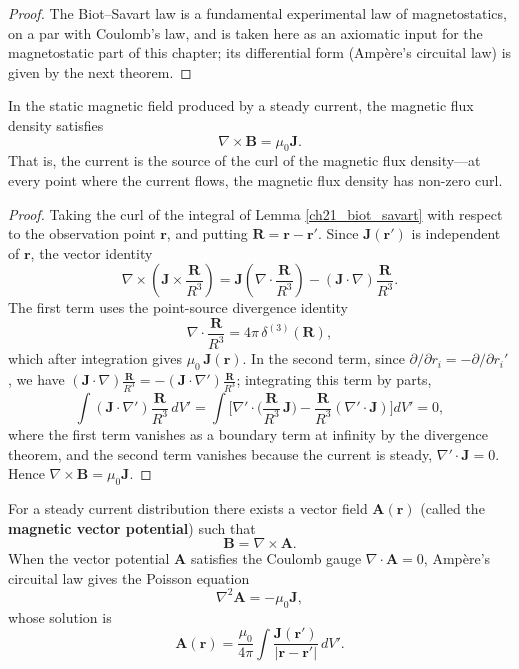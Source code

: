 \begin{proof}
The Biot--Savart law is a fundamental experimental law of magnetostatics, on a par with Coulomb's law, and is taken here as an axiomatic input for the magnetostatic part of this chapter; its differential form (Amp\`ere's circuital law) is given by the next theorem.
\end{proof}

\begin{theorem}\label{thm:ampere_law}
In the static magnetic field produced by a steady current, the magnetic flux density satisfies
\[
\boxed{\nabla \times \mathbf{B} = \mu_0 \mathbf{J}}.
\]
That is, the current is the source of the curl of the magnetic flux density---at every point where the current flows, the magnetic flux density has non-zero curl.
\end{theorem}

\begin{proof}
Taking the curl of the integral of Lemma \ref{ch21_biot_savart} with respect to the observation point $\mathbf{r}$, and putting $\mathbf{R}=\mathbf{r}-\mathbf{r}'$. Since $\mathbf{J}(\mathbf{r}')$ is independent of $\mathbf{r}$, the vector identity
\[
\nabla\times\left(\mathbf{J}\times\frac{\mathbf{R}}{R^3}\right)
= \mathbf{J}\left(\nabla\cdot\frac{\mathbf{R}}{R^3}\right)
- (\mathbf{J}\cdot\nabla)\frac{\mathbf{R}}{R^3}.
\]
The first term uses the point-source divergence identity
\[
\nabla\cdot\frac{\mathbf{R}}{R^3} = 4\pi\,\delta^{(3)}(\mathbf{R}),
\]
which after integration gives $\mu_0\,\mathbf{J}(\mathbf{r})$. In the second term, since $\partial/\partial r_i = -\partial/\partial r_i'$, we have $(\mathbf{J}\cdot\nabla)\frac{\mathbf{R}}{R^3} = -(\mathbf{J}\cdot\nabla')\frac{\mathbf{R}}{R^3}$; integrating this term by parts,
\[
\int (\mathbf{J}\cdot\nabla')\frac{\mathbf{R}}{R^3}\,dV'
= \int\Big[\nabla'\cdot\Big(\frac{\mathbf{R}}{R^3}\,\mathbf{J}\Big) - \frac{\mathbf{R}}{R^3}(\nabla'\cdot\mathbf{J})\Big]dV'
= 0,
\]
where the first term vanishes as a boundary term at infinity by the divergence theorem, and the second term vanishes because the current is steady, $\nabla'\cdot\mathbf{J}=0$. Hence $\nabla\times\mathbf{B} = \mu_0\mathbf{J}$.
\end{proof}

\begin{theorem}\label{thm:magnetic_vector_potential}
For a steady current distribution there exists a vector field $\mathbf{A}(\mathbf{r})$ (called the \textbf{magnetic vector potential}) such that
\[
\boxed{\mathbf{B} = \nabla \times \mathbf{A}}.
\]
When the vector potential $\mathbf{A}$ satisfies the Coulomb gauge $\nabla \cdot \mathbf{A} = 0$, Amp\`ere's circuital law gives the Poisson equation
\[
\nabla^2 \mathbf{A} = -\mu_0 \mathbf{J},
\]
whose solution is
\[
\mathbf{A}(\mathbf{r}) = \frac{\mu_0}{4\pi} \int \frac{\mathbf{J}(\mathbf{r}')}{|\mathbf{r}-\mathbf{r}'|}\, dV'.
\]
\end{theorem}


